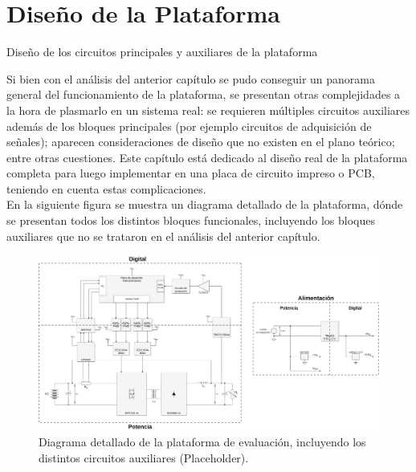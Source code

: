 \section{Diseño de la Plataforma} \label{diseño}
\thispagestyle{plain}

\vspace{0.5cm}

\Large\scshape
\begin{center}
    \textrm{Diseño de los circuitos principales y auxiliares de la plataforma}
\end{center}
\normalfont

\divider

Si bien con el análisis del anterior capítulo se pudo conseguir un panorama general del funcionamiento de la plataforma, se presentan otras complejidades a la hora de plasmarlo en un sistema real: se requieren múltiples circuitos auxiliares además de los bloques principales (por ejemplo circuitos de adquisición de señales); aparecen consideraciones de diseño que no existen en el plano teórico; entre otras cuestiones. Este capítulo está dedicado al diseño real de la plataforma completa para luego implementar en una placa de circuito impreso o PCB, teniendo en cuenta estas complicaciones.\\

En la siguiente figura se muestra un diagrama detallado de la plataforma, dónde se presentan todos los distintos bloques funcionales, incluyendo los bloques auxiliares que no se trataron en el análisis del anterior capítulo.\\

\begin{figure}[h]
    \centering
    \includegraphics[scale=0.2]{Imagenes/Plataforma Detallada.pdf}
    \caption{Diagrama detallado de la plataforma de evaluación, incluyendo los distintos circuitos auxiliares (Placeholder).}
    \label{diag_detallado}
\end{figure}


